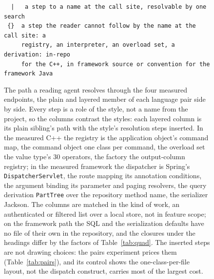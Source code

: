 \documentclass[journal]{IEEEtran}
\begin{document}
\begin{figure}[!t]
\begin{verbatim}
  |   a step to a name at the call site, resolvable by one search
 {}  a step the reader cannot follow by the name at the call site: a
     registry, an interpreter, an overload set, a derivation: in-repo
     for the C++, in framework source or convention for the framework Java
\end{verbatim}
\caption{The path a reading agent resolves through the four measured
endpoints, the plain and layered member of each language pair side by
side. Every step is a role of the style, not a name from the project, so
the columns contrast the styles: each layered column is its plain
sibling's path with the style's resolution steps inserted. In the
measured C++ the registry is the application object's command map, the
command object one class per command, the overload set the value type's
30 operators, the factory the output-column registry; in the measured
framework the dispatcher is Spring's \texttt{DispatcherServlet}, the
route mapping its annotation conditions, the argument binding its
parameter and paging resolvers, the query derivation \texttt{PartTree}
over the repository method name, the serializer Jackson. The columns are
matched in the kind of work, an authenticated or filtered list over a
local store, not in feature scope; on the framework path the SQL and the
serialization defaults have no file of their own in the repository, and
the closures under the headings differ by the factors of
Table~\ref{tab:quad}. The inserted steps are not drawing choices: the
pairs experiment prices them (Table~\ref{tab:pairs}), and its control
shows the one-class-per-file layout, not the dispatch construct, carries
most of the largest cost.}
\label{fig:paths}
\end{figure}
\end{document}
